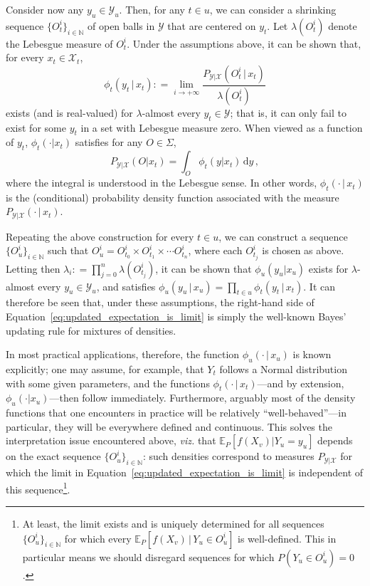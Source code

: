 \documentclass[twoside,11pt]{article}
\newcommand{\nats}{\mathbb{N}}
\newcommand{\states}{\mathcal{X}}
\newcommand{\observs}{\mathcal{Y}}
\newcommand{\coloneqq}{:\!=}
\begin{document}
Consider now any $y_u\in\observs_u$. Then, for any $t\in u$, we can consider a shrinking sequence $\{O_t^i\}_{i\in\nats}$ of open balls in $\observs$ that are centered on $y_t$. Let $\lambda(O_t^i)$ denote the Lebesgue measure of $O_t^i$. Under the assumptions above, it can be shown that, for every $x_t\in\states_t$,
\begin{equation*}
\phi_t(y_t\,\vert\,x_t) \coloneqq \lim_{i\to+\infty} \frac{P_{\observs\vert\states}(O_t^i\,\vert\,x_t)}{\lambda(O_t^i)}
\end{equation*}
exists (and is real-valued) for $\lambda$-almost every $y_t\in\observs$; that is, it can only fail to exist for some $y_t$ in a set with Lebesgue measure zero. When viewed as a function of $y_t$, $\phi_t(\cdot\vert x_t)$ satisfies for any $O\in\Sigma$,
\begin{equation}\label{eq:density_generates_measure}
P_{\observs\vert\states}(O\vert x_t) = \int_{O}\phi_t(y\vert x_t) \,\mathrm{d}y\,,
\end{equation}
where the integral is understood in the Lebesgue sense. In other words, $\phi_t(\cdot\,\vert\,x_t)$ is the (conditional) probability density function associated with the measure $P_{\observs\vert\states}(\cdot\,\vert\, x_t)$.

Repeating the above construction for every $t\in u$, we can construct a sequence $\{O_u^i\}_{i\in\nats}$ such that $O_u^i=O_{t_0}^i\times O_{t_1}^i\times\cdots O_{t_n}^i$, where each $O_{t_j}^i$ is chosen as above. Letting then $\lambda_i\coloneqq \prod_{j=0}^n\lambda(O_{t_j}^i)$, it can be shown that $\phi_u(y_u\vert x_u)$ exists for $\lambda$-almost every $y_u\in\observs_u$, and satisfies $\phi_u(y_u\,\vert\,x_u) = \prod_{t\in u} \phi_t(y_t\,\vert\,x_t)$.
It can therefore be seen that, under these assumptions, the right-hand side of Equation~\eqref{eq:updated_expectation_is_limit} is simply the well-known Bayes' updating rule for mixtures of densities. 

In most practical applications, therefore, the function $\phi_u(\cdot\,\vert\,x_u)$ is known explicitly; one may assume, for example, that $Y_t$ follows a Normal distribution with some given parameters, and the functions $\phi_t(\cdot\,\vert\,x_t)$---and by extension, $\phi_u(\cdot\vert x_u)$---then follow immediately. Furthermore, arguably most of the density functions that one encounters in practice will be relatively ``well-behaved''---in particular, they will be everywhere defined and continuous. This solves the interpretation issue encountered above, \emph{viz.} that $\mathbb{E}_P[f(X_v)\vert Y_u=y_u]$ depends on the exact sequence $\{O_u^i\}_{i\in\nats}$: such densities correspond to measures $P_{\observs\vert\states}$ for which the limit in Equation~\eqref{eq:updated_expectation_is_limit} is independent of this sequence\footnote{At least, the limit exists and is uniquely determined for all sequences $\{O_u^i\}_{i\in\nats}$ for which every $\mathbb{E}_P[f(X_v)\,\vert\,Y_u\in O_u^i]$ is well-defined. This in particular means we should disregard sequences for which $P(Y_u\in O_u^i)=0$.}.
\end{document}
